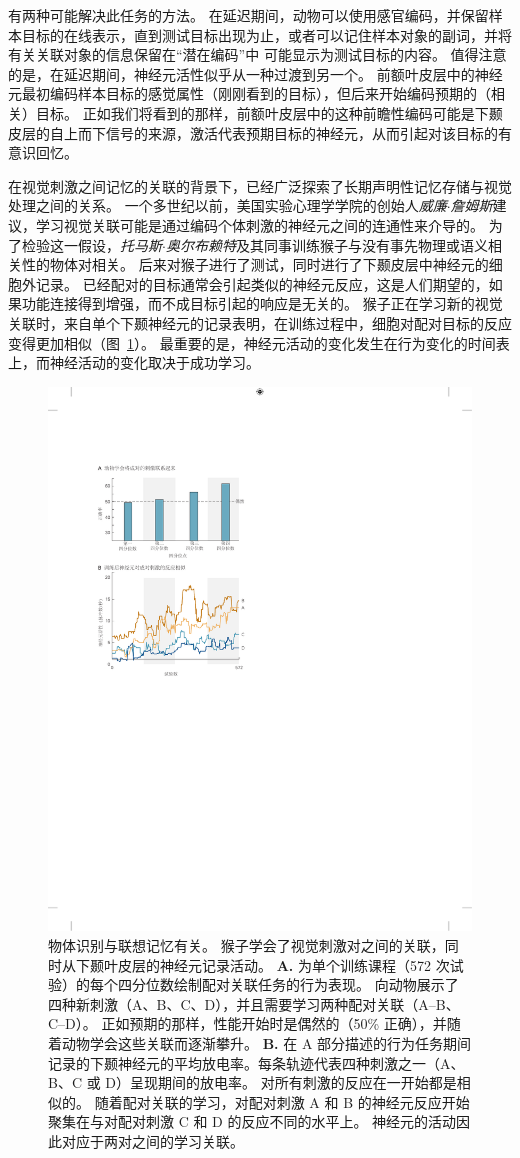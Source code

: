 有两种可能解决此任务的方法。
在延迟期间，动物可以使用感官编码，并保留样本目标的在线表示，直到测试目标出现为止，或者可以记住样本对象的副词，并将有关关联对象的信息保留在“潜在编码”中 可能显示为测试目标的内容。
值得注意的是，在延迟期间，神经元活性似乎从一种过渡到另一个。
前额叶皮层中的神经元最初编码样本目标的感觉属性（刚刚看到的目标），但后来开始编码预期的（相关）目标。 
正如我们将看到的那样，前额叶皮层中的这种前瞻性编码可能是下颞皮层的自上而下信号的来源，激活代表预期目标的神经元，从而引起对该目标的有意识回忆。


在视觉刺激之间记忆的关联的背景下，已经广泛探索了长期声明性记忆存储与视觉处理之间的关系。
一个多世纪以前，美国实验心理学学院的创始人\textit{威廉$\cdot$詹姆斯}建议，学习视觉关联可能是通过编码个体刺激的神经元之间的连通性来介导的。 为了检验这一假设，\textit{托马斯$\cdot$奥尔布赖特}及其同事训练猴子与没有事先物理或语义相关性的物体对相关。
后来对猴子进行了测试，同时进行了下颞皮层中神经元的细胞外记录。
已经配对的目标通常会引起类似的神经元反应，这是人们期望的，如果功能连接得到增强，而不成目标引起的响应是无关的。
猴子正在学习新的视觉关联时，来自单个下颞神经元的记录表明，在训练过程中，细胞对配对目标的反应变得更加相似（图~\ref{fig:24_12}）。
最重要的是，神经元活动的变化发生在行为变化的时间表上，而神经活动的变化取决于成功学习。


\begin{figure}[htbp]
	\centering
	\includegraphics[width=0.65\linewidth]{chap24/fig_24_12}
	\caption{物体识别与联想记忆有关。
		猴子学会了视觉刺激对之间的关联，同时从下颞叶皮层的神经元记录活动。
		\textbf{A.} 为单个训练课程（572 次试验）的每个四分位数绘制配对关联任务的行为表现。
		向动物展示了四种新刺激（A、B、C、D），并且需要学习两种配对关联（A–B、C–D）。
		正如预期的那样，性能开始时是偶然的（50\% 正确），并随着动物学会这些关联而逐渐攀升。
		\textbf{B.} 在 A 部分描述的行为任务期间记录的下颞神经元的平均放电率。每条轨迹代表四种刺激之一（A、B、C 或 D）呈现期间的放电率。
		对所有刺激的反应在一开始都是相似的。
		随着配对关联的学习，对配对刺激 A 和 B 的神经元反应开始聚集在与对配对刺激 C 和 D 的反应不同的水平上。
		神经元的活动因此对应于两对之间的学习关联。}
	\label{fig:24_12}
\end{figure}


